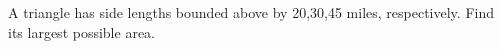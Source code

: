 A triangle has side lengths bounded above by 20,30,45 miles, respectively. Find its largest possible area.
